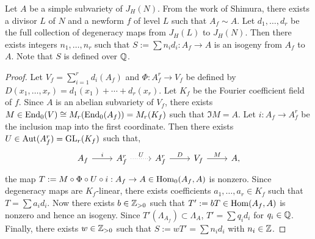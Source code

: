\documentclass{article}
\begin{document}
\begin{proposition}
    \label{prop:integral_degen}
    Let $A$ be a simple subvariety of $J_H(N)$. From the work of Shimura,
    there exists a divisor $L$ of $N$ and a newform $f$ of level $L$ such that
    $A_f \sim A$. Let $d_1,\ldots,d_r$ be the full collection of degeneracy
    maps from $J_H(L)$ to $J_H(N)$. Then there exists integers $n_1,\ldots,n_r$
    such that $S:=\sum n_i d_i: A_f\to A$ is an isogeny from $A_f$ to $A$. Note
    that $S$ is defined over $\mathbb{Q}$.
\end{proposition}
\begin{proof}
    Let $V_f=\sum_{i=1} ^r d_i(A_f)$ and $\Phi:A_f ^r \to V_f$ be defined by
    $D(x_1,\ldots,x_r) = d_1(x_1)+\cdots+d_r(x_r)$. Let $K_f$ be the Fourier
    coefficient field of $f$. Since $A$ is an abelian subvariety of $V_f$, there
    exists $M\in \operatorname{End}_0(V)\cong M_r(\operatorname{End}_0(A_f)) = M_r (K_f)$ such that $\Im M
    = A$. Let $i:A_f\to A_f ^r$ be the inclusion map into the first coordinate.
    Then there exists $U\in \operatorname{Aut}(A_f ^r)=\operatorname{GL}_r (K_f)$ such that,
    \[
        \begin{tikzcd}
            A_f \arrow[r,"i"] &
            A_f ^r \arrow[r, dotted, "U"] &
            A_f ^r \arrow[r, "D"] &
            V_f \arrow[r, "M"] &
            A,
        \end{tikzcd}
    \]
    the map $T:=M \circ \Phi \circ U\circ i:A_f\to A\in \operatorname{Hom}_0(A_f, A)$ is
    nonzero. Since degeneracy maps are $K_f$-linear, there exists coefficients
    $a_1,\ldots,a_r\in K_f$ such that $T = \sum a_i d_i$. Now there exists
    $b\in \mathbb{Z}_{>0}$ such that $T':=bT\in \operatorname{Hom}(A_f, A)$ is nonzero and hence an
    isogeny. Since $T'(\Lambda_{A_f})\subset \Lambda_A$, $T'=\sum q_i d_i$
    for $q_i\in \mathbb{Q}$. Finally, there exists $w\in \mathbb{Z}_{>0}$ such that
    $S:=wT'=\sum n_i d_i$ with $n_i\in \mathbb{Z}$.
\end{proof}
\end{document}
